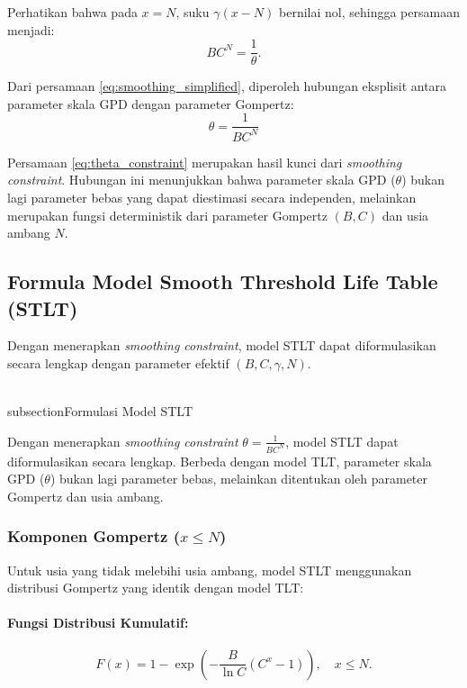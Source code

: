 Perhatikan bahwa pada $x = N$, suku $\gamma(x-N)$ bernilai nol, sehingga persamaan menjadi:
\begin{equation}
BC^N = \frac{1}{\theta}.
\label{eq:smoothing_simplified}
\end{equation}

Dari persamaan \eqref{eq:smoothing_simplified}, diperoleh hubungan eksplisit antara parameter skala GPD dengan parameter Gompertz:
\begin{equation}
\boxed{\theta = \frac{1}{BC^N}}
\label{eq:theta_constraint}
\end{equation}

Persamaan \eqref{eq:theta_constraint} merupakan hasil kunci dari \textit{smoothing constraint}. Hubungan ini menunjukkan bahwa parameter skala GPD ($\theta$) bukan lagi parameter bebas yang dapat diestimasi secara independen, melainkan merupakan fungsi deterministik dari parameter Gompertz $(B, C)$ dan usia ambang $N$.

\subsection{Formula Model Smooth Threshold Life Table (STLT)}

Dengan menerapkan \textit{smoothing constraint}, model STLT dapat diformulasikan secara lengkap dengan parameter efektif $(B, C, \gamma, N)$.

\\subsection{Formulasi Model STLT}

Dengan menerapkan \textit{smoothing constraint} $\theta = \frac{1}{BC^N}$, model STLT dapat diformulasikan secara lengkap. Berbeda dengan model TLT, parameter skala GPD ($\theta$) bukan lagi parameter bebas, melainkan ditentukan oleh parameter Gompertz dan usia ambang.

\subsubsection{Komponen Gompertz ($x \leq N$)}

Untuk usia yang tidak melebihi usia ambang, model STLT menggunakan distribusi Gompertz yang identik dengan model TLT:

\paragraph{Fungsi Distribusi Kumulatif:}
\begin{equation}
F(x) = 1 - \exp\left(-\frac{B}{\ln C}(C^x - 1)\right), \quad x \leq N.
\label{eq:stlt_gompertz_cdf}
\end{equation}

